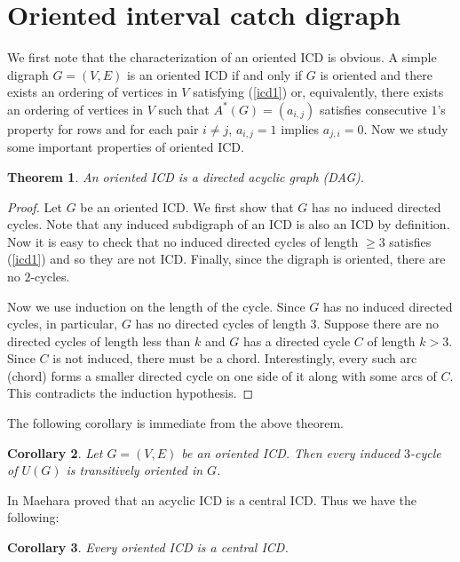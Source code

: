 \documentclass{article}
\newtheorem{thm}{Theorem}[section]
\newtheorem{cor}[thm]{Corollary}
\theoremstyle{definition}
\numberwithin{equation}{section}
\begin{document}
\section{Oriented interval catch digraph}

\noindent We first note that the characterization of an oriented ICD is obvious. A simple digraph $G=(V,E)$ is an oriented ICD if and only if $G$ is oriented and there exists an ordering of vertices in $V$ satisfying (\ref{icd1}) or, equivalently, there exists an ordering of vertices in $V$ such that $A^*(G)=(a_{i,j})$ satisfies consecutive $1$'s property for rows and for each pair $i\neq j$, $a_{i,j}=1$ implies $a_{j,i}=0$. Now we study some important properties of oriented ICD.

\begin{thm}\label{dag}
An oriented ICD is a directed acyclic graph (DAG).
\end{thm}

\begin{proof}
Let $G$ be an oriented ICD. We first show that $G$ has no induced directed cycles. Note that any induced subdigraph of an ICD is also an ICD by definition. Now it is easy to check that no induced directed cycles of length $\geq 3$ satisfies (\ref{icd1}) and so they are not ICD. Finally, since the digraph is oriented, there are no $2$-cycles.

\vspace{1em}\noindent
Now we use induction on the length of the cycle. Since $G$ has no induced directed cycles, in particular, $G$ has no directed cycles of length $3$. Suppose there are no directed cycles of length less than $k$ and $G$ has a directed cycle $C$ of length $k>3$. Since $C$ is not induced, there must be a chord. Interestingly, every such arc (chord) forms a smaller directed cycle on one side of it along with some arcs of $C$. This contradicts the induction hypothesis.
\end{proof}

\noindent
The following corollary is immediate from the above theorem.

\begin{cor}\label{ss1}
Let $G=(V,E)$ be an oriented ICD. Then every induced $3$-cycle of $U(G)$ is transitively oriented in $G$.
\end{cor}

\noindent
In \cite{Maehera} Maehara proved that an acyclic ICD is a central ICD. Thus we have the following:

\begin{cor}
Every oriented ICD is a central ICD.
\end{cor}
\end{document}
